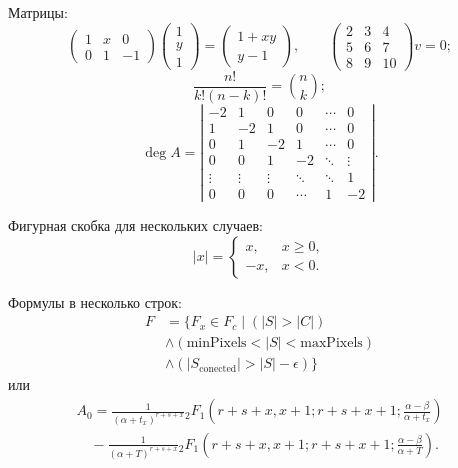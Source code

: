\documentclass[a4paper, 14pt]{extreport}
\begin{document}
Матрицы:
\begin{equation}
    \begin{pmatrix}
        1 & x & 0 \\
        0 & 1 & -1
    \end{pmatrix}
    \begin{pmatrix}
        1  \\
        y  \\
        1
    \end{pmatrix}
    =
    \begin{pmatrix}
        1 + xy  \\
        y - 1
    \end{pmatrix},
    \quad\quad
    \left(
    \begin{matrix}
        2 & 3 & 4\\
        5 & 6 & 7\\
        8 & 9 & 10
    \end{matrix}
    \right)
    v = 0;
\end{equation}
\begin{equation}
    \frac{n!}{k!(n-k)!} = \binom{n}{k};
\end{equation}
\begin{equation}
    \deg A =
    \left|
    \begin{matrix}
        -2 & 1 & 0 & 0 & \cdots & 0  \\
        1 & -2 & 1 & 0 & \cdots & 0  \\
        0 & 1 & -2 & 1 & \cdots & 0  \\
        0 & 0 & 1 & -2 & \ddots & \vdots \\
        \vdots & \vdots & \vdots & \ddots & \ddots & 1  \\
        0 & 0 & 0 & \cdots & 1 & -2
    \end{matrix}
    \right|.
\end{equation}

Фигурная скобка для нескольких случаев:
\begin{equation}
    |x| =
    \begin{cases}
        x, & x \ge 0, \\
        -x, & x< 0.
    \end{cases}
\end{equation}

Формулы в несколько строк:
\begin{align*}
    F &= \{ F_{x} \in F_{c} \mid (|S| > |C|) \\
      &\wedge (\mathrm{minPixels} < |S| < \mathrm{maxPixels}) \\
      &\wedge (|S_{\mathrm{conected}}| > |S| - \epsilon) \}
\end{align*}
или
\begin{multline}
    A_0 = \frac{1}{(\alpha + t_x)^{r + s + x}}{}_2 F_1 \left( r + s + x, x + 1; r + s + x + 1; \frac{\alpha - \beta}{\alpha + t_x} \right) \\
    \quad - \frac{1}{(\alpha + T)^{r + s + x}}{}_2 F_1 \left( r + s + x, x + 1; r + s + x + 1; \frac{\alpha - \beta}{\alpha + T} \right).
\end{multline}
\end{document}
